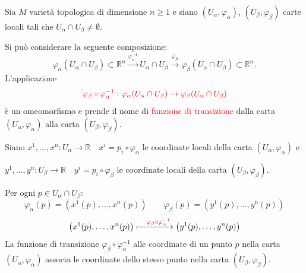         \begin{definizione}
        Sia $M$ varietà topologica di dimensione $n \ge 1$ e siano $(U_\alpha, \varphi_\alpha)$, $(U_\beta, \varphi_\beta)$ carte locali tali che $U_\alpha \cap U_\beta \neq \emptyset$. 
        
        Si può considerare la seguente composizione:
        \[
        \varphi_\alpha(U_\alpha \cap U_\beta) \subset \mathbb{R}^n \xrightarrow{\varphi_\alpha^{-1}} U_\alpha \cap U_\beta \xrightarrow{\varphi_\beta} \varphi_\beta(U_\alpha \cap U_\beta) \subset \mathbb{R}^n.
        \]
        L'applicazione
        \[
        \color{red} \varphi_\beta \circ \varphi_\alpha^{-1} : \varphi_\alpha(U_\alpha \cap U_\beta) \to \varphi_\beta(U_\alpha \cap U_\beta)
        \]
        è un omeomorfismo e prende il nome di \textcolor{red}{funzione di transizione} dalla carta $(U_\alpha, \varphi_\alpha)$ alla carta $(U_\beta, \varphi_\beta)$.

        Siano $x^1, \dots, x^n : U_\alpha \to \mathbb{R} \quad x^i = p_i \circ \varphi_\alpha$ le coordinate locali della carta $(U_\alpha, \varphi_\alpha)$ e 
        
        $y^1, \dots, y^n : U_\beta \to \mathbb{R} \quad y^i = p_i \circ \varphi_\beta$ le coordinate locali della carta $(U_\beta, \varphi_\beta)$. 
        
        Per ogni $p \in U_\alpha \cap U_\beta$:
        \[
        \varphi_\alpha(p) = \left(x^1(p), \dots, x^n(p)\right) \qquad \varphi_\beta(p) = \left(y^1(p), \dots, y^n(p)\right)
        \]
        \[
        \left(x^1(p), \dots, x^n(p)\right) \xmapsto{\quad \textcolor{red}{\varphi_\beta \circ \varphi_\alpha^{-1}}} \left(y^1(p), \dots, y^n(p)\right)
        \]
        La funzione di transizione $\varphi_\beta \circ \varphi_\alpha^{-1}$ alle coordinate di un punto $p$ nella carta $(U_\alpha, \varphi_\alpha)$
        associa le coordinate dello stesso punto nella carta $(U_\beta, \varphi_\beta)$.

        \begin{center}
\end{center}
\end{definizione}
